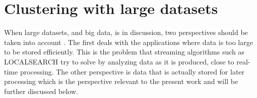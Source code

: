 

%
%

\section{Clustering with large datasets}
\label{sec:big data}







When large datasets, and big data, is in discussion, two perspectives should be taken into account \cite{Aggarwal2014}.
The first deals with the applications where data is too large to be stored efficiently.
This is the problem that streaming algorithms such as LOCALSEARCH \cite{bigdatastream} try to solve by analyzing data as it is produced, close to real-time processing.
The other perspective is data that is actually stored for later processing which is the perspective relevant to the present work and will be further discussed below.

